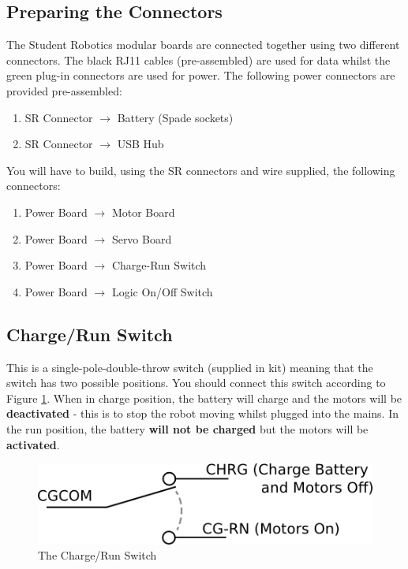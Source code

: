 \documentclass[a4paper, 12pt]{article}
\begin{document}
\subsection{Preparing the Connectors}
The Student Robotics modular boards are connected together using two different connectors. The black RJ11 cables (pre-assembled) are used for data whilst the green plug-in connectors are used for power. The following power connectors are provided pre-assembled:
\begin{enumerate}
\item SR Connector \(\rightarrow\) Battery (Spade sockets)
\item SR Connector \(\rightarrow\) USB Hub
\end{enumerate}

You will have to build, using the SR connectors and wire supplied, the following connectors:

\begin{enumerate}
\item Power Board  \(\rightarrow\) Motor Board
\item Power Board  \(\rightarrow\) Servo Board
\item Power Board  \(\rightarrow\) Charge-Run Switch
\item Power Board  \(\rightarrow\) Logic On/Off Switch
\end{enumerate}

\subsection{Charge/Run Switch}
This is a single-pole-double-throw switch (supplied in kit) meaning that the switch has two possible positions. You should connect this switch according to Figure \ref{fig:chrgrun}. When in charge position, the battery will charge and the motors will be \textbf{deactivated} - this is to stop the robot moving whilst plugged into the mains. In the run position, the battery \textbf{will not be charged} but the motors will be \textbf{activated}.
\begin{figure}[h!]
\center
\includegraphics[scale=0.5]{chrg-run-switch}
\caption{The Charge/Run Switch}
\label{fig:chrgrun}
\end{figure}
\end{document}
